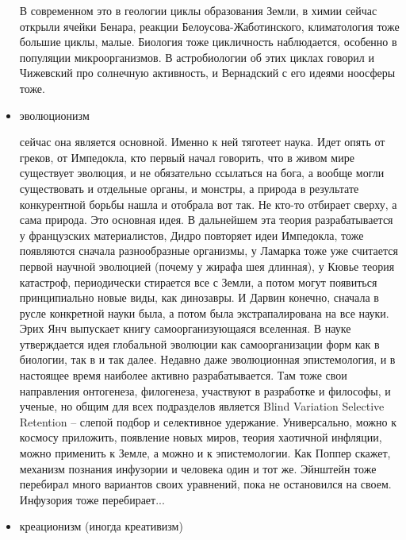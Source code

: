 \documentclass[a4paper, 12pt]{article}
\begin{document}
\begin{itemize}
    В современном это в геологии циклы образования Земли, в химии сейчас 
    открыли ячейки Бенара, реакции Белоусова-Жаботинского, 
    климатология тоже большие циклы, малые. Биология тоже цикличность 
    наблюдается, особенно в популяции микроорганизмов. В астробиологии 
    об этих циклах говорил и Чижевский про солнечную активность, 
    и Вернадский с его идеями ноосферы тоже.

  \item эволюционизм

    сейчас она является основной. Именно к ней тяготеет наука. Идет 
    опять от греков, от Импедокла, кто первый начал говорить, что 
    в живом мире существует эволюция, и не обязательно ссылаться на 
    бога, а вообще могли существовать и отдельные органы, и монстры, 
    а природа в результате конкурентной борьбы нашла и отобрала вот так. 
    Не кто-то отбирает сверху, а сама природа. Это основная идея. 
    В дальнейшем эта теория разрабатывается у французских материалистов, 
    Дидро повторяет идеи Импедокла, тоже появляются сначала 
    разнообразные организмы, у Ламарка тоже уже считается первой научной 
    эволюцией (почему у жирафа шея длинная), у Кювье теория катастроф, 
    периодически стирается все с Земли, а потом могут появиться 
    принципиально новые виды, как динозавры. И Дарвин конечно, сначала 
    в русле конкретной науки была, а потом была экстрапалирована на все 
    науки. Эрих Янч выпускает книгу самоорганизующаяся вселенная. 
    В науке утверждается идея глобальной эволюции как самоорганизации 
    форм как в биологии, так в и так далее. Недавно даже эволюционная 
    эпистемология, и в настоящее время наиболее активно разрабатывается. 
    Там тоже свои направления онтогенеза, филогенеза, участвуют 
    в разработке и философы, и ученые, но общим для всех подразделов 
    является Blind Variation Selective Retention -- слепой подбор 
    и селективное удержание. Универсально, можно к космосу приложить, 
    появление новых миров, теория хаотичной инфляции, можно применить 
    к Земле, а можно и к эпистемологии. Как Поппер скажет, механизм 
    познания инфузории и человека один и тот же. Эйнштейн тоже перебирал 
    много вариантов своих уравнений, пока не остановился на своем. 
    Инфузория тоже перебирает...

  \item креационизм (иногда креативизм)


\end{itemize}
\end{document}
